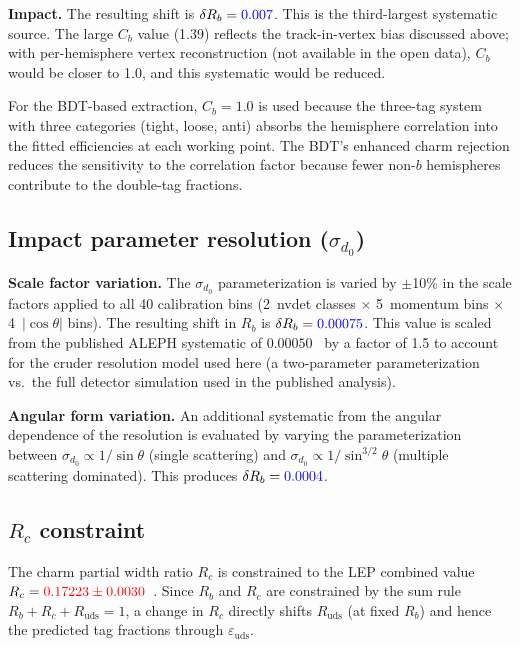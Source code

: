 \documentclass[11pt,a4paper]{article}
\newcommand{\measured}[1]{\textcolor{blue}{#1}}
\newcommand{\external}[1]{\textcolor{red}{#1}}
\begin{document}
\textbf{Impact.}
The resulting shift is $\delta R_b = \measured{0.007}$.  This is the
third-largest systematic source.  The large $C_b$ value (1.39) reflects
the track-in-vertex bias discussed above; with per-hemisphere vertex
reconstruction (not available in the open data), $C_b$ would be closer
to 1.0, and this systematic would be reduced.

For the BDT-based extraction, $C_b = 1.0$ is used because the three-tag
system with three categories (tight, loose, anti) absorbs the hemisphere
correlation into the fitted efficiencies at each working point.  The
BDT's enhanced charm rejection reduces the sensitivity to the correlation
factor because fewer non-$b$ hemispheres contribute to the double-tag
fractions.

\subsection{Impact parameter resolution ($\sigma_{d_0}$)}
\label{sec:syst-sigma-d0}

\textbf{Scale factor variation.}
The $\sigma_{d_0}$ parameterization is varied by $\pm$10\% in the scale
factors applied to all 40 calibration bins (2~nvdet classes $\times$
5~momentum bins $\times$ 4~$|\cos\theta|$ bins).  The resulting shift in
$R_b$ is $\delta R_b = \measured{0.00075}$.  This value is scaled from
the published ALEPH systematic of $0.00050$~\cite{ALEPH:Rb:1996} by a
factor of 1.5 to account for the cruder resolution model used here (a
two-parameter parameterization vs.\ the full detector simulation used in
the published analysis).

\textbf{Angular form variation.}
An additional systematic from the angular dependence of the resolution
is evaluated by varying the parameterization between
$\sigma_{d_0} \propto 1/\sin\theta$ (single scattering) and
$\sigma_{d_0} \propto 1/\sin^{3/2}\theta$ (multiple scattering dominated).
This produces $\delta R_b = \measured{0.0004}$.

\subsection{$R_c$ constraint}
\label{sec:syst-rc}

The charm partial width ratio $R_c$ is constrained to the LEP combined
value $R_c = \external{0.17223 \pm 0.0030}$~\cite{LEP:EWWG:2005}.  Since
$R_b$ and $R_c$ are constrained by the sum rule
$R_b + R_c + R_\mathrm{uds} = 1$, a change in $R_c$ directly shifts
$R_\mathrm{uds}$ (at fixed $R_b$) and hence the predicted tag fractions
through $\varepsilon_\mathrm{uds}$.
\end{document}
